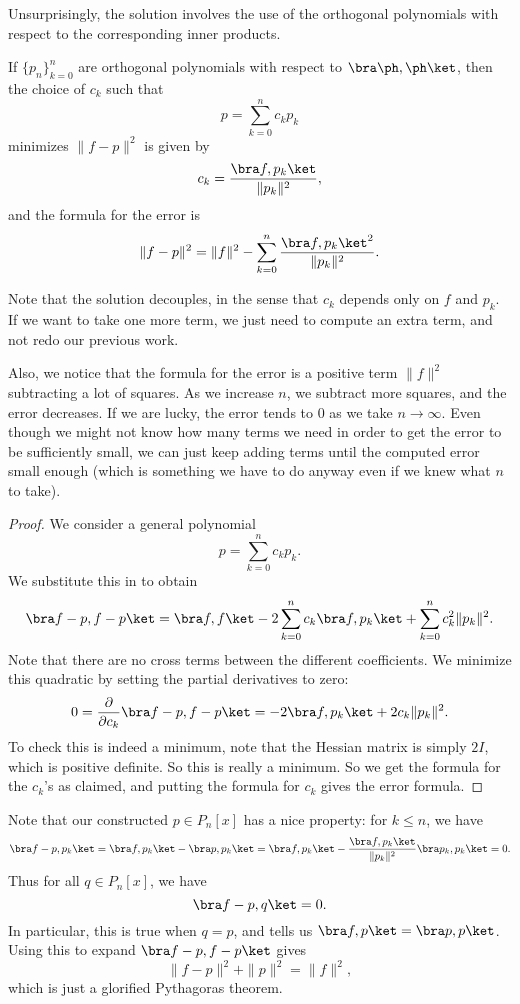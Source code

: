\documentclass[a4paper]{article}
\begin{document}
Unsurprisingly, the solution involves the use of the orthogonal polynomials with respect to the corresponding inner products.
\begin{thm}
  If $\{p_n\}_{k = 0}^n$ are orthogonal polynomials with respect to $\bra \ph, \ph \ket$, then the choice of $c_k$ such that
  \[
    p = \sum_{k = 0}^n c_k p_k
  \]
  minimizes $\|f - p\|^2$ is given by
  \[
    c_k = \frac{\bra f, p_k\ket}{\|p_k\|^2},
  \]
  and the formula for the error is
  \[
    \|f - p\|^2 = \|f\|^2 - \sum_{k = 0}^n \frac{\bra f, p_k\ket^2}{\|p_k\|^2}.
  \]
\end{thm}
Note that the solution decouples, in the sense that $c_k$ depends only on $f$ and $p_k$. If we want to take one more term, we just need to compute an extra term, and not redo our previous work.

Also, we notice that the formula for the error is a positive term $\|f\|^2$ subtracting a lot of squares. As we increase $n$, we subtract more squares, and the error decreases. If we are lucky, the error tends to $0$ as we take $n \to \infty$. Even though we might not know how many terms we need in order to get the error to be sufficiently small, we can just keep adding terms until the computed error small enough (which is something we have to do anyway even if we knew what $n$ to take).

\begin{proof}
  We consider a general polynomial
  \[
    p = \sum_{k = 0}^n c_k p_k.
  \]
  We substitute this in to obtain
  \[
    \bra f - p, f - p\ket = \bra f, f\ket - 2 \sum_{k = 0}^n c_k \bra f, p_k\ket + \sum_{k = 0}^n c_k^2 \|p_k\|^2.
  \]
  Note that there are no cross terms between the different coefficients. We minimize this quadratic by setting the partial derivatives to zero:
  \[
    0 = \frac{\partial}{\partial c_k} \bra f - p, f - p\ket = -2 \bra f, p_k\ket + 2c_k \|p_k\|^2.
  \]
  To check this is indeed a minimum, note that the Hessian matrix is simply $2I$, which is positive definite. So this is really a minimum. So we get the formula for the $c_k$'s as claimed, and putting the formula for $c_k$ gives the error formula.
\end{proof}

Note that our constructed $p \in P_n[x]$ has a nice property: for $k \leq n$, we have
\[
  \bra f - p, p_k\ket = \bra f, p_k\ket - \bra p, p_k\ket = \bra f, p_k\ket - \frac{\bra f, p_k\ket}{\|p_k\|^2} \bra p_k, p_k\ket = 0.
\]
Thus for all $q \in P_n[x]$, we have
\[
  \bra f - p, q\ket = 0.
\]
In particular, this is true when $q = p$, and tells us $\bra f, p\ket = \bra p, p\ket$. Using this to expand $\bra f - p, f - p\ket$ gives
\[
  \|f - p\|^2 + \|p\|^2 = \|f\|^2,
\]
which is just a glorified Pythagoras theorem.
\end{document}
